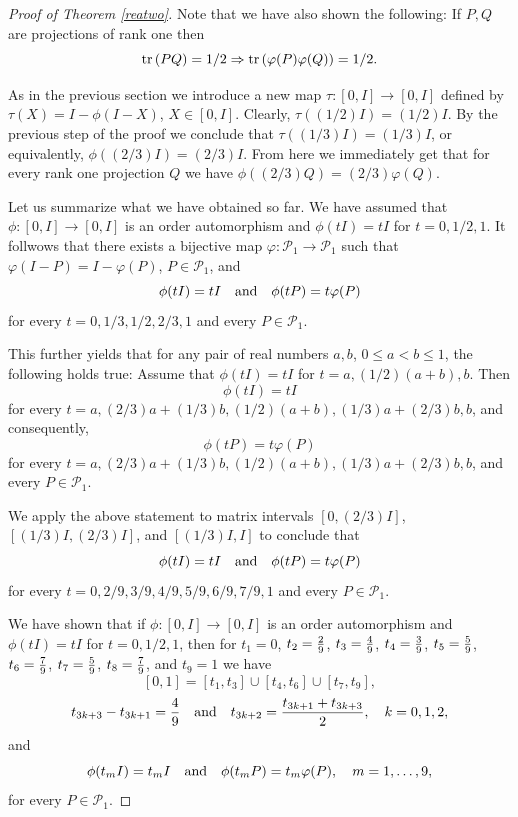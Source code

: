 \documentclass{article}
\begin{document}
\begin{proof}[Proof of Theorem \ref{reatwo}]
Note that we have also shown the following: If $P,Q$ are projections of rank one then  \begin{equation}\label{trhalf} {\rm tr} \, (PQ) = 1/2 \Rightarrow {\rm tr} \, (\varphi(P) \varphi(Q)) = 1/2. \end{equation}

As in the previous section we introduce a new map $\tau : [0,I] \to [0,I]$ defined by $\tau (X) = I - \phi (I-X)$, $X \in [0,I]$. Clearly, $\tau ((1/2)I) = (1/2)I$. By the previous step of the proof we conclude that 
$\tau ((1/3)I) = (1/3)I$, or equivalently, $\phi ((2/3)I) = (2/3)I$. From here we immediately get that  for every rank one projection $Q$ we have $\phi ((2/3)Q) = (2/3)\varphi (Q)$.

Let us summarize what we have obtained so far. We have assumed that $\phi : [0,I] \to [0, I]$ is an order automorphism and $\phi (tI) = tI$ for $t= 0, 1/2, 1$.
It follwows that there exists a bijective map $\varphi : \mathcal{P}_1 \to \mathcal{P}_1$ such that $\varphi (I-P) = I - \varphi (P)$, $P \in \mathcal{P}_1$, and
$$
\phi (tI) = tI \ \ \ {\rm and} \ \ \ \phi (tP) = t \varphi (P)
$$
for every $t=0, 1/3, 1/2, 2/3, 1$ and every $P \in \mathcal{P}_1$.

This further yields that for any pair of real numbers $a,b$, $0 \le a < b \le 1$, the following holds true: 
Assume that $\phi (tI) = tI$ for $t= a, (1/2) (a+b), b$.
Then 
$$
\phi (tI) = tI 
$$
for every $t=a, (2/3)a + (1/3)b, (1/2) (a+b), (1/3)a + (2/3)b, b$, and consequently,
$$
\phi (tP) = t \varphi(P)
$$
for every $t=a, (2/3)a + (1/3)b, (1/2) (a+b), (1/3)a + (2/3)b, b$, and
every $P \in \mathcal{P}_1$.

We apply the above statement to matrix intervals $[0, (2/3)I]$, $[(1/3)I, (2/3)I]$, and $[(1/3)I, I]$ to conclude that
$$
\phi (tI) = tI \ \ \ {\rm and} \ \ \ \phi (tP) = t \varphi (P)
$$
for every $t=0, 2/9, 3/9, 4/9, 5/9, 6/9, 7/9, 1$ and every $P \in \mathcal{P}_1$. 

We have shown that if $\phi : [0,I] \to [0, I]$ is an order automorphism and $\phi (tI) = tI$ for $t= 0, 1/2, 1$, then for $t_1 = 0$,  $t_2 = {2\over 9}$,
 $t_{3} = {4\over 9}$,  $t_{4} = {3 \over 9}$,  $t_{5} = {5\over 9}$,
 $t_{6} = {7\over 9}$,  $t_{7} = {5\over 9}$,  $t_{8} = {7\over 9}$, and
 $t_{9} = 1$ we have
$$
[0,1] = [t_1 , t_3 ] \cup  [t_4 , t_6 ] \cup  [t_7 , t_9 ] ,
$$
$$
t_{3k+3}  - t_{3k+1} = {4 \over 9} \ \ \ {\rm and} \ \ \ t_{3k+2} = { t_{3k+1}  + t_{3k+3} \over 2}, \ \ \ k=0,1,2,
$$
and 
$$
\phi (t_m I) = t_m I \ \ \ {\rm and} \ \ \ \phi (t_m P) = t_m \varphi (P), \ \ \ m = 1, \ldots, 9,
$$
for every $P \in \mathcal{P}_1$. 
 

\end{proof}
\end{document}
